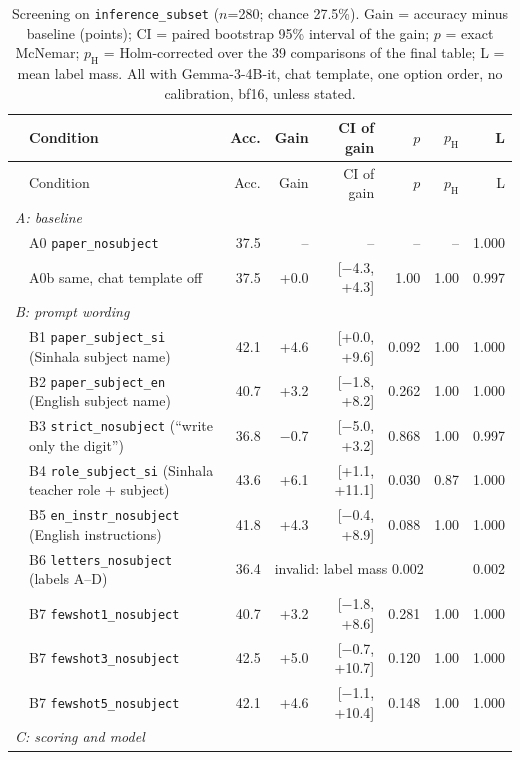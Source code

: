 \documentclass[10pt,a4paper]{article}
\newcommand{\cond}[1]{\texttt{#1}}
\begin{document}
{\footnotesize\setlength{\tabcolsep}{4pt}
\begin{longtable}{p{0.5ex}lrrrrrr}
\caption{Screening on \texttt{inference\_subset} ($n$=280; chance 27.5\%). Gain = accuracy minus baseline (points);
CI = paired bootstrap 95\% interval of the gain; $p$ = exact McNemar; $p_\text{H}$ = Holm-corrected over the 39
comparisons of the final table; L = mean label mass. All with Gemma-3-4B-it, chat template, one option order, no
calibration, bf16, unless stated.}\label{tab:screen}\\
\toprule
& Condition & Acc. & Gain & CI of gain & $p$ & $p_\text{H}$ & L\\
\midrule
\endfirsthead
\toprule
& Condition & Acc. & Gain & CI of gain & $p$ & $p_\text{H}$ & L\\
\midrule
\endhead
\multicolumn{8}{l}{\textit{A: baseline}}\\
& A0 \cond{paper\_nosubject} & 37.5 & -- & -- & -- & -- & 1.000\\
& A0b same, chat template off & 37.5 & +0.0 & [$-$4.3, +4.3] & 1.00 & 1.00 & 0.997\\
\multicolumn{8}{l}{\textit{B: prompt wording}}\\
& B1 \cond{paper\_subject\_si} (Sinhala subject name) & 42.1 & +4.6 & [+0.0, +9.6] & 0.092 & 1.00 & 1.000\\
& B2 \cond{paper\_subject\_en} (English subject name) & 40.7 & +3.2 & [$-$1.8, +8.2] & 0.262 & 1.00 & 1.000\\
& B3 \cond{strict\_nosubject} (``write only the digit'') & 36.8 & $-$0.7 & [$-$5.0, +3.2] & 0.868 & 1.00 & 0.997\\
& B4 \cond{role\_subject\_si} (Sinhala teacher role + subject) & 43.6 & +6.1 & [+1.1, +11.1] & 0.030 & 0.87 & 1.000\\
& B5 \cond{en\_instr\_nosubject} (English instructions) & 41.8 & +4.3 & [$-$0.4, +8.9] & 0.088 & 1.00 & 1.000\\
& B6 \cond{letters\_nosubject} (labels A--D) & 36.4 & \multicolumn{4}{l}{invalid: label mass 0.002} & 0.002\\
& B7 \cond{fewshot1\_nosubject} & 40.7 & +3.2 & [$-$1.8, +8.6] & 0.281 & 1.00 & 1.000\\
& B7 \cond{fewshot3\_nosubject} & 42.5 & +5.0 & [$-$0.7, +10.7] & 0.120 & 1.00 & 1.000\\
& B7 \cond{fewshot5\_nosubject} & 42.1 & +4.6 & [$-$1.1, +10.4] & 0.148 & 1.00 & 1.000\\
\multicolumn{8}{l}{\textit{C: scoring and model}}\\

\end{longtable}}
\end{document}
